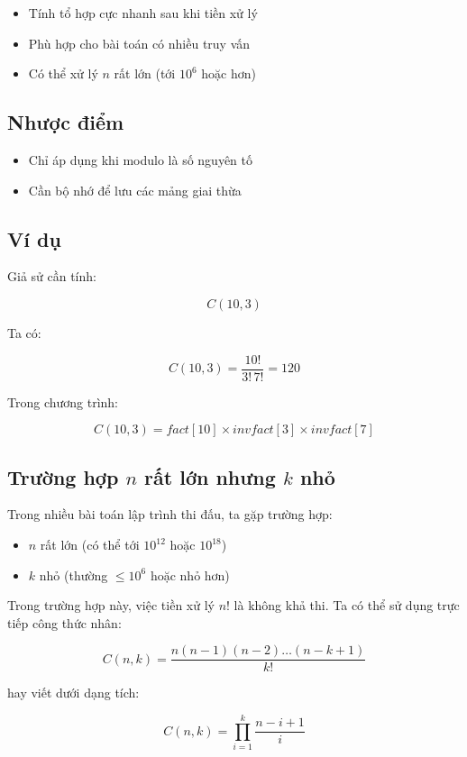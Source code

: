 \begin{itemize}
\item Tính tổ hợp cực nhanh sau khi tiền xử lý
\item Phù hợp cho bài toán có nhiều truy vấn
\item Có thể xử lý $n$ rất lớn (tới $10^6$ hoặc hơn)
\end{itemize}

\subsection*{Nhược điểm}

\begin{itemize}
\item Chỉ áp dụng khi modulo là số nguyên tố
\item Cần bộ nhớ để lưu các mảng giai thừa
\end{itemize}

\subsection*{Ví dụ}

Giả sử cần tính:

\[
C(10,3)
\]

Ta có:

\[
C(10,3)=
\frac{10!}{3!\,7!}
=120
\]

Trong chương trình:

\[
C(10,3) =
fact[10] \times invfact[3] \times invfact[7]
\]

\subsection{Trường hợp $n$ rất lớn nhưng $k$ nhỏ}

Trong nhiều bài toán lập trình thi đấu, ta gặp trường hợp:

\begin{itemize}
\item $n$ rất lớn (có thể tới $10^{12}$ hoặc $10^{18}$)
\item $k$ nhỏ (thường $\le 10^6$ hoặc nhỏ hơn)
\end{itemize}

Trong trường hợp này, việc tiền xử lý $n!$ là không khả thi. Ta có thể sử dụng trực tiếp công thức nhân:

\[
C(n,k) =
\frac{n(n-1)(n-2)\dots(n-k+1)}{k!}
\]

hay viết dưới dạng tích:

\[
C(n,k) =
\prod_{i=1}^{k}
\frac{n-i+1}{i}
\]

